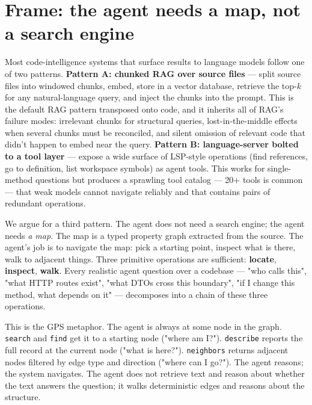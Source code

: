 \documentclass[11pt,a4paper]{article}
\begin{document}
\vspace{0.6em}

\section{Frame: the agent needs a map, not a search engine}
\label{sec:frame}

Most code-intelligence systems that surface results to language models follow one of two patterns. \textbf{Pattern A: chunked RAG over source files} --- split source files into windowed chunks, embed, store in a vector database, retrieve the top-$k$ for any natural-language query, and inject the chunks into the prompt. This is the default RAG \cite{lewis2020rag} pattern transposed onto code, and it inherits all of RAG's failure modes: irrelevant chunks for structural queries, lost-in-the-middle effects \cite{liu2023lostmiddle} when several chunks must be reconciled, and silent omission of relevant code that didn't happen to embed near the query. \textbf{Pattern B: language-server bolted to a tool layer} --- expose a wide surface of LSP-style operations (find references, go to definition, list workspace symbols) as agent tools. This works for single-method questions but produces a sprawling tool catalog --- 20+ tools is common --- that weak models cannot navigate reliably and that contains pairs of redundant operations.

We argue for a third pattern. The agent does not need a search engine; the agent needs \emph{a map}. The map is a typed property graph extracted from the source. The agent's job is to navigate the map: pick a starting point, inspect what is there, walk to adjacent things. Three primitive operations are sufficient: \textbf{locate}, \textbf{inspect}, \textbf{walk}. Every realistic agent question over a codebase --- "who calls this", "what HTTP routes exist", "what DTOs cross this boundary", "if I change this method, what depends on it" --- decomposes into a chain of these three operations.

This is the GPS metaphor. The agent is always at some node in the graph. \texttt{search} and \texttt{find} get it to a starting node ("where am I?"). \texttt{describe} reports the full record at the current node ("what is here?"). \texttt{neighbors} returns adjacent nodes filtered by edge type and direction ("where can I go?"). The agent reasons; the system navigates. The agent does not retrieve text and reason about whether the text answers the question; it walks deterministic edges and reasons about the structure.
\end{document}
